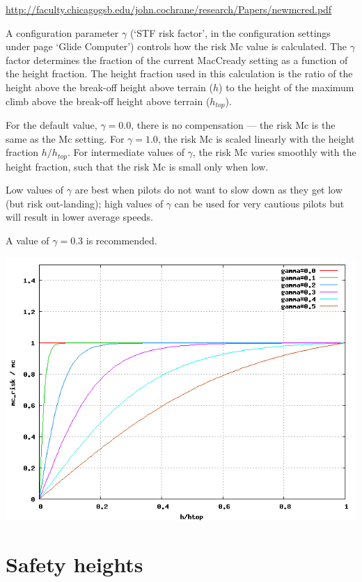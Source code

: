 \documentclass[a4paper,12pt]{refrep}
\begin{document}
\url{http://faculty.chicagogsb.edu/john.cochrane/research/Papers/newmcred.pdf}

  A configuration parameter $\gamma$ (`STF risk factor', in the
  configuration settings under page `Glide Computer') controls how the
  risk Mc value is calculated.  The $\gamma$ factor determines the
  fraction of the current MacCready setting as a function of the
  height fraction.  The height fraction used in this calculation is
  the ratio of the height above the break-off height above terrain
  ($h$) to the height of the maximum climb above the break-off height
  above terrain ($h_{top}$).

  For the default value, $\gamma=0.0$, there is no compensation ---
  the risk Mc is the same as the Mc setting.  For $\gamma=1.0$, the
  risk Mc is scaled linearly with the height fraction $h/h_{top}$.
  For intermediate values of $\gamma$, the risk Mc varies smoothly
  with the height fraction, such that the risk Mc is small only when
  low.

  Low values of $\gamma$ are best when pilots do not want to slow down
  as they get low (but risk out-landing); high values of $\gamma$ can
  be used for very cautious pilots but will result in lower average
  speeds.

  A value of $\gamma=0.3$ is recommended.

\begin{center}
\includegraphics[angle=0,width=\linewidth,keepaspectratio='true']{figures/riskmc.png}
\end{center}

\section{Safety heights}\label{sec:safety-heights}
\end{document}
